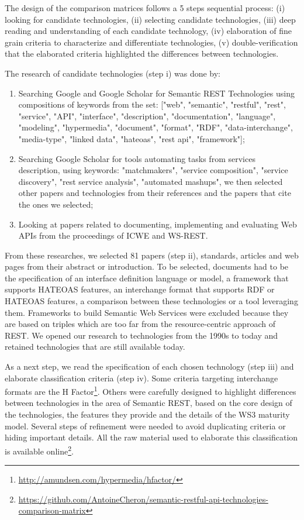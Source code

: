 The design of the comparison matrices follows a 5 steps sequential process: (i) looking for candidate technologies, (ii) selecting candidate technologies, (iii) deep reading and understanding of each candidate technology, (iv) elaboration of fine grain criteria to characterize and differentiate technologies, (v) double-verification that the elaborated criteria highlighted the differences between technologies.

The research of candidate technologies (step i) was done by:

\begin{enumerate}
    \item Searching Google and Google Scholar for Semantic REST Technologies using compositions of keywords from the set: ["web", "semantic", "restful", "rest", "service", "API", "interface", "description", "documentation", "language", "modeling", "hypermedia", "document", "format", "RDF", "data-interchange", "media-type", "linked data", "hateoas", "rest api", "framework"];
    \item Searching Google Scholar for tools automating tasks from services description, using keywords: "matchmakers", "service composition", "service discovery", "rest service analysis", "automated mashups", we then selected other papers and technologies from their references and the papers that cite the ones we selected;
    \item Looking at papers related to documenting, implementing and evaluating Web APIs from the proceedings of ICWE and WS-REST. 
\end{enumerate}

From these researches, we selected 81 papers (step ii), standards, articles and web pages from their abstract or introduction. To be selected, documents had to be the specification of an interface definition language or model, a framework that supports HATEOAS features, an interchange format that supports RDF or HATEOAS features, a comparison between these technologies or a tool leveraging them. Frameworks to build Semantic Web Services were excluded because they are based on triples which are too far from the resource-centric approach of REST. We opened our research to technologies from the 1990s to today and retained technologies that are still available today.

As a next step, we read the specification of each chosen technology (step iii) and elaborate classification criteria (step iv). Some criteria targeting interchange formats are the H Factor\footnote{\url{http://amundsen.com/hypermedia/hfactor/}}. Others were carefully designed to highlight differences between technologies in the area of Semantic REST, based on the core design of the technologies, the features they provide and the details of the WS3 maturity model. Several steps of refinement were needed to avoid duplicating criteria or hiding important details. All the raw material used to elaborate this classification is available online\footnote{\url{https://github.com/AntoineCheron/semantic-restful-api-technologies-comparison-matrix}}. 

